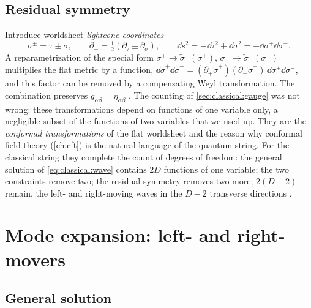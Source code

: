 \subsection{Residual symmetry}\label{sec:classical:residual}

Introduce worldsheet \emph{lightcone coordinates}
\begin{equation}\label{eq:classical:lc}
  \sigma^\pm=\tau\pm\sigma,\qquad \partial_\pm=\tfrac12(\partial_\tau\pm\partial_\sigma),\qquad
  \dd s^2=-\dd\tau^2+\dd\sigma^2=-\dd\sigma^+\dd\sigma^- .
\end{equation}
A reparametrization of the special form $\sigma^+\to\tilde\sigma^+(\sigma^+)$,
$\sigma^-\to\tilde\sigma^-(\sigma^-)$ multiplies the flat metric by a function,
$\dd\tilde\sigma^+\dd\tilde\sigma^-=(\partial_+\tilde\sigma^+)(\partial_-\tilde\sigma^-)\,
\dd\sigma^+\dd\sigma^-$, and this factor can be removed by a compensating Weyl transformation.
The combination preserves $g_{\alpha\beta}=\eta_{\alpha\beta}$
. The counting of \cref{sec:classical:gauge} was not wrong:
these transformations depend on functions of one variable only, a negligible subset of the
functions of two variables that we used up. They are the \emph{conformal transformations}%
 of the flat worldsheet and the reason why conformal field
theory (\cref{ch:cft}) is the natural language of the quantum string. For the classical
string they complete the count of degrees of freedom: the general solution of
\eqref{eq:classical:wave} contains $2D$ functions of one variable; the two constraints remove
two; the residual symmetry removes two more; $2(D-2)$ remain, the left- and right-moving
waves in the $D-2$ transverse directions .

\section{Mode expansion: left- and right-movers}\label{sec:classical:modes}

\subsection{General solution}

